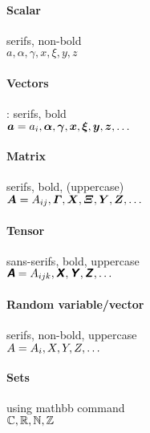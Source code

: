 \documentclass{article}
\begin{document}
	\paragraph{Scalar} serifs, non-bold \\
	$a, \alpha, \gamma, x, \xi, y, z $
	\paragraph{Vectors}: serifs, bold \\
	$\bm{a} = a_i, \bm{\alpha}, \bm{\gamma},  \bm{x}, \bm{\xi}, \bm{y}, \bm{z}, \dots$
	
	\paragraph{Matrix} serifs, bold, (uppercase) \\
	$\bm{A} = A_{ij} , \bm{\varGamma},  \bm{X}, \bm{\varXi}, \bm{Y}, \bm{Z}, \dots$
		
	\paragraph{Tensor} sans-serifs, bold, uppercase \\
	$\textsf{\textbf{\textsl{A}}} = A_{ijk}, \textsf{\textbf{\textsl{X}}}, \textsf{\textbf{\textsl{Y}}}, \textsf{\textbf{\textsl{Z}}}, \dots $	
	
	\paragraph{Random variable/vector} serifs, non-bold, uppercase \\
	$A = A_{i}, X, Y, Z, \dots $			
	
	\paragraph{Sets} using mathbb command\\
	$ \mathbb{C}, \mathbb{R}, \mathbb{N}, \mathbb{Z} $	
	
\end{document}
